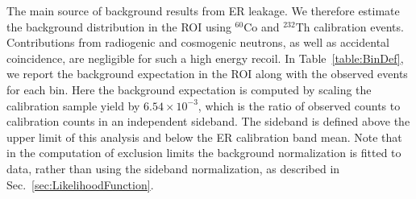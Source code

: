 The main source of background results from ER leakage. We therefore estimate the background distribution in the ROI using $^{60}$Co and $^{232}$Th calibration events.  
Contributions from radiogenic and cosmogenic neutrons, as well as accidental coincidence, are negligible for such a high energy recoil. In Table~\ref{table:BinDef}, we report the 
background expectation in the ROI along with the observed events for each bin.
Here the background expectation is computed by scaling the calibration sample yield by $6.54\times10^{-3}$, which is the ratio of observed counts to calibration counts in an independent sideband. The sideband is defined above the upper limit of this analysis and below the ER calibration band mean. Note that in the computation of exclusion limits the background normalization is fitted to data, rather than using the sideband normalization, as described in Sec.~\ref{sec:LikelihoodFunction}. 



\begin{table}

  \label{table:BinDef} 
\end{table}






